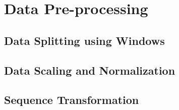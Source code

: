 \section{Data Pre-processing}

\subsection{Data Splitting using Windows}

\subsection{Data Scaling and Normalization}

\subsection{Sequence Transformation}
